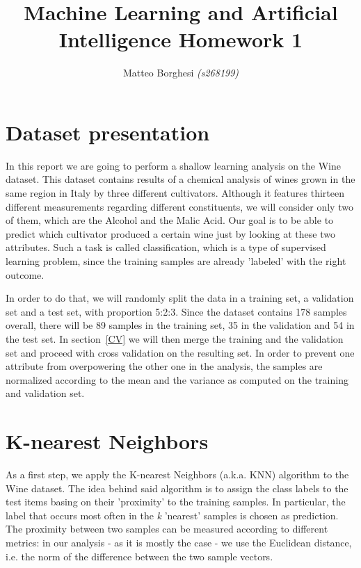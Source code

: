\documentclass[11pt,twoside,a4paper]{article}
\begin{document}
\title{Machine Learning and Artificial Intelligence Homework 1}
\author{Matteo Borghesi \textit{(s268199)}}
\maketitle

\section{Dataset presentation}
In this report we are going to perform a shallow learning analysis on the Wine dataset. 
This dataset contains results of a chemical analysis of wines grown in the same region in Italy by three different cultivators. Although it features thirteen different measurements regarding different constituents, we will consider only two of them, which are the Alcohol and the Malic Acid. Our goal is to be able to predict which cultivator produced a certain wine just by looking at these two attributes. Such a task is called classification, which is a type of supervised learning problem, since the training samples are already 'labeled' with the right outcome.

In order to do that, we will randomly split the data in a training set, a validation set and a test set, with proportion 5:2:3. Since the dataset contains 178 samples overall, there will be 89 samples in the training set, 35 in the validation and 54 in the test set.
In section~\ref{CV} we will then merge the training and the validation set and proceed with cross validation on the resulting set.\newline
In order to prevent one attribute from overpowering the other one in the analysis, the samples are normalized according to the mean and the variance as computed on the training and validation set.

\section{K-nearest Neighbors}
\label{KNN}
As a first step, we apply the K-nearest Neighbors (a.k.a. KNN) algorithm to the Wine dataset. The idea behind said algorithm is to assign the class labels to the test items basing on their 'proximity' to the training samples. In particular, the label that occurs most often in the \emph{k} 'nearest' samples is chosen as prediction. The proximity between two samples can be measured according to different metrics: in our analysis - as it is mostly the case - we use the Euclidean distance, i.e. the norm of the difference between the two sample vectors.
\end{document}
